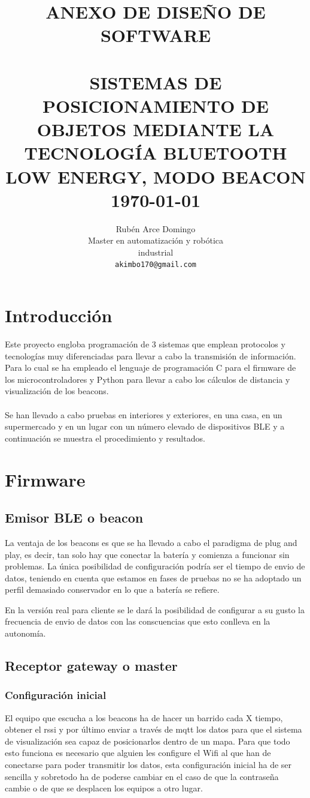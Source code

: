 \documentclass[paper=a4, fontsize=11pt,twoside]{scrartcl}
\title{	\normalsize \textsc{ANEXO DE DISEÑO DE SOFTWARE} 	%
		 	\\[2.0cm]								%
			\HRule{0.5pt} \\						%
			\LARGE \textbf{\uppercase{Sistemas de posicionamiento de objetos mediante la tecnología Bluetooth Low Energy, modo Beacon}}	%
			\HRule{2pt} \\ [0.5cm]		%
			\normalsize \today			%
		}
\author{
		Rubén Arce Domingo\\	
		Master en automatización y robótica\\	
		industrial\\
        \texttt{akimbo170@gmail.com} \\
}
\makeatletter
\def\printtitle{%
    {\centering \@title\par}}
\def\printauthor{%
    {\centering \large \@author}}
\makeatother
\begin{document}
\thispagestyle{empty}		%
\printtitle					%
  	\vfill
\printauthor				%
\newpage
\cleardoublepage
\tableofcontents
\listoffigures
\cleardoublepage
\pagestyle{fancy}
\section{Introducción}
    Este proyecto engloba programación de 3 sistemas que emplean protocolos y tecnologías muy diferenciadas para llevar a cabo 
    la transmisión de información. Para lo cual se ha empleado el lenguaje de programación C para el firmware de los 
    microcontroladores y Python para llevar a cabo los cálculos de distancia y visualización de los beacons.
    \paragraph{}
    Se han llevado a cabo pruebas en interiores y exteriores, en una casa, en un supermercado y en un lugar con un número elevado de dispositivos BLE y
    a continuación se muestra el procedimiento y resultados.
\section{Firmware}
    \subsection{Emisor BLE o beacon}
        La ventaja de los beacons es que se ha llevado a cabo el paradigma de plug and play, es decir, tan solo hay que conectar la batería y comienza 
        a funcionar sin problemas. La única posibilidad de configuración podría ser el tiempo de envio de datos, teniendo en cuenta que estamos en fases 
        de pruebas no se ha adoptado un perfil demasiado conservador en lo que a batería se refiere. 

        En la versión real para cliente se le dará la posibilidad de configurar a su gusto la frecuencia de envio de datos con las conscuencias 
        que esto conlleva en la autonomía.
    \subsection{Receptor gateway o master}
        \subsubsection{Configuración inicial}
            El equipo que escucha a los beacons ha de hacer un barrido cada X tiempo, obtener el rssi y por último enviar a través de mqtt los datos 
            para que el sistema de visualización sea capaz de posicionarlos dentro de un mapa.
            Para que todo esto funciona es necesario que alguien les configure el Wifi al que han de conectarse para poder transmitir los datos,
            esta configuración inicial ha de ser sencilla y sobretodo ha de poderse cambiar en el caso de que la contraseña cambie o de que se desplacen 
            los equipos a otro lugar.
            
\end{document}
